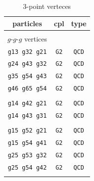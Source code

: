 \documentclass[a4paper,11pt]{article}
\begin{document}
\begin{table}
\begin{center}
\small
\caption{3-point verteces}
\label{3}
\begin{tabular}{ccc}
\hline
\hline
particles&cpl&type\\
\hline\\
$g$-$g$-$g$ vertices&&\\
{\tt g13 g32 g21}&{\tt G2}&{\tt QCD}\\
{\tt g24 g43 g32}&{\tt G2}&{\tt QCD}\\
{\tt g35 g54 g43}&{\tt G2}&{\tt QCD}\\
{\tt g46 g65 g54}&{\tt G2}&{\tt QCD}\\\\
{\tt g14 g42 g21}&{\tt G2}&{\tt QCD}\\
{\tt g14 g43 g31}&{\tt G2}&{\tt QCD}\\\\
{\tt g15 g52 g21}&{\tt G2}&{\tt QCD}\\
{\tt g15 g54 g41}&{\tt G2}&{\tt QCD}\\
{\tt g25 g53 g32}&{\tt G2}&{\tt QCD}\\
{\tt g25 g54 g42}&{\tt G2}&{\tt QCD}\\\\


\end{tabular}
\end{center}
\end{table}
\end{document}
